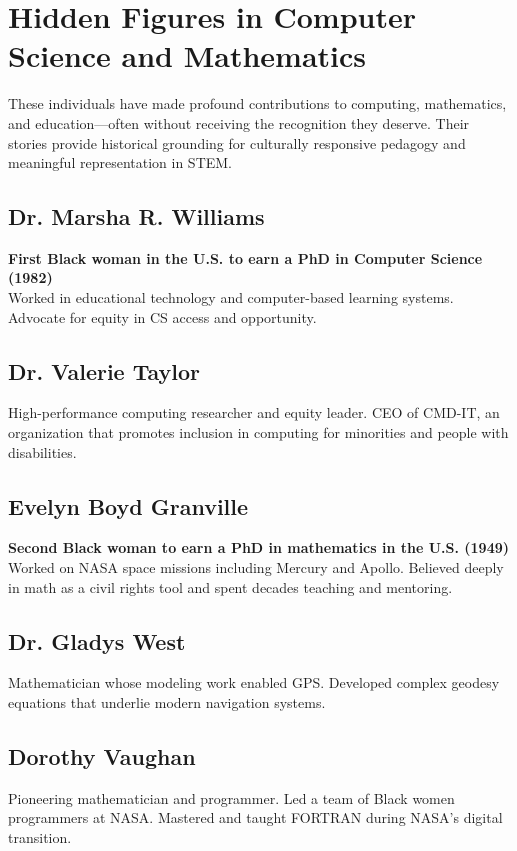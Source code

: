 \documentclass[12pt]{article}
\begin{document}
\section*{Hidden Figures in Computer Science and Mathematics}

These individuals have made profound contributions to computing, mathematics, and education—often without receiving the recognition they deserve. Their stories provide historical grounding for culturally responsive pedagogy and meaningful representation in STEM.

\subsection*{Dr. Marsha R. Williams}
\textbf{First Black woman in the U.S. to earn a PhD in Computer Science (1982)}\\
Worked in educational technology and computer-based learning systems. Advocate for equity in CS access and opportunity.

\subsection*{Dr. Valerie Taylor}
High-performance computing researcher and equity leader. CEO of CMD-IT, an organization that promotes inclusion in computing for minorities and people with disabilities.

\subsection*{Evelyn Boyd Granville}
\textbf{Second Black woman to earn a PhD in mathematics in the U.S. (1949)}\\
Worked on NASA space missions including Mercury and Apollo. Believed deeply in math as a civil rights tool and spent decades teaching and mentoring.

\subsection*{Dr. Gladys West}
Mathematician whose modeling work enabled GPS. Developed complex geodesy equations that underlie modern navigation systems.

\subsection*{Dorothy Vaughan}
Pioneering mathematician and programmer. Led a team of Black women programmers at NASA. Mastered and taught FORTRAN during NASA’s digital transition.
\end{document}
